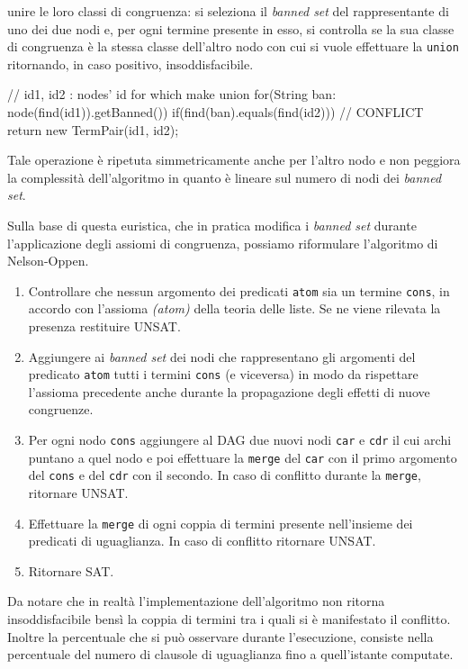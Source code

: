 \documentclass[a4paper,11pt]{article}
\begin{document}
unire le loro classi di congruenza: si seleziona il \emph{banned set} 
del rappresentante di uno dei due nodi e, per ogni termine presente in 
esso, si controlla se la sua classe di congruenza è la stessa classe dell'altro 
nodo con cui si vuole effettuare la \texttt{union} ritornando, in caso 
positivo, insoddisfacibile.
\begin{java}
// id1, id2 : nodes' id for which make union
for(String ban: node(find(id1)).getBanned())
		if(find(ban).equals(find(id2))) // CONFLICT
			return new TermPair(id1, id2);
\end{java}
Tale operazione è ripetuta simmetricamente anche per l'altro nodo e 
non peggiora la complessità dell'algoritmo in quanto è lineare sul numero
di nodi dei \emph{banned set}.\par 
Sulla base di questa euristica, che in pratica modifica i \emph{banned set} 
durante l'applicazione degli assiomi di congruenza, possiamo riformulare 
l'algoritmo di Nelson-Oppen.
\begin{enumerate}
\item Controllare che nessun argomento dei predicati \texttt{atom} sia un 
termine \texttt{cons}, in accordo con l'assioma \emph{(atom)} della teoria
delle liste. Se ne viene rilevata la presenza restituire UNSAT.
\item Aggiungere ai \emph{banned set} dei nodi che rappresentano gli 
argomenti del predicato \texttt{atom} tutti i termini \texttt{cons} (e 
viceversa) in modo da rispettare l'assioma precedente anche durante 
la propagazione degli effetti di nuove congruenze.
\item Per ogni nodo \texttt{cons} aggiungere al DAG due nuovi nodi 
\texttt{car} e \texttt{cdr} il cui archi puntano a quel nodo e 
poi effettuare la \texttt{merge} del \texttt{car} con il primo argomento 
del \texttt{cons} e del \texttt{cdr} con il secondo. In caso di conflitto
durante la \texttt{merge}, ritornare UNSAT.
\item Effettuare la \texttt{merge} di ogni coppia di termini presente 
nell'insieme dei predicati di uguaglianza. In caso di conflitto ritornare 
UNSAT. 
\item Ritornare SAT.
\end{enumerate}
Da notare che in realtà l'implementazione dell'algoritmo non ritorna 
insoddisfacibile bensì la coppia di termini tra i quali si è 
manifestato il conflitto. Inoltre la percentuale che si può osservare 
durante l'esecuzione, consiste nella percentuale del numero di clausole di 
uguaglianza fino a quell'istante computate.\par
\end{document}
